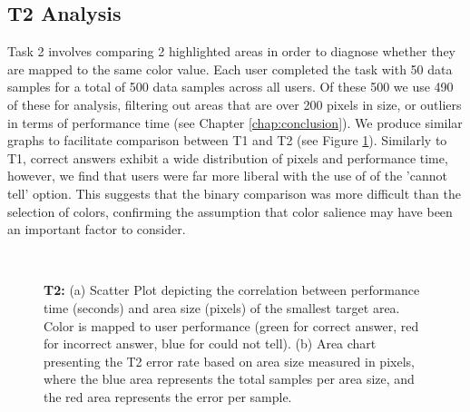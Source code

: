 \subsection{T2 Analysis}
Task 2 involves comparing 2 highlighted areas in order to diagnose whether they are mapped to the same color value. Each user completed the task with 50 data samples for a total of 500 data samples across all users. Of these 500 we use 490 of these for analysis, filtering out areas that are over 200 pixels in size, or outliers in terms of performance time (see Chapter \ref{chap:conclusion}).  We produce similar graphs to facilitate comparison between T1 and T2 (see Figure \ref{fig:t2results}). Similarly to T1, correct answers exhibit a wide distribution of pixels and performance time, however, we find that users were far more liberal with the use of of the 'cannot tell' option. This suggests that the binary comparison was more difficult than the selection of colors, confirming the assumption that color salience may have been an important factor to consider.

\begin{figure}[p]
\centering
{} \\ \vspace{-0.35cm}
\caption{\textbf{T2:} (a) Scatter Plot depicting the correlation between performance time (seconds) and area size (pixels) of the smallest target area. Color is mapped to user performance (green for correct answer, red for incorrect answer, blue for could not tell). (b) Area chart presenting the T2 error rate based on area size measured in pixels, where the blue area represents the total samples per area size, and the red area represents the error per sample.} \label{fig:t2results} \vspace{-0.6cm}
\end{figure}

